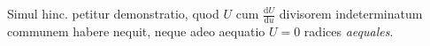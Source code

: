 \expandafter\def\csname HistoricalNoteText20\endcsname{Simul hinc. petitur demonstratio, quod $U$ cum
$\frac{\mathrm{d}U}{\mathrm{d}u}$ divisorem indeterminatum
communem habere nequit, neque adeo aequatio $U=0$ radices
\emph{aequales}.}
